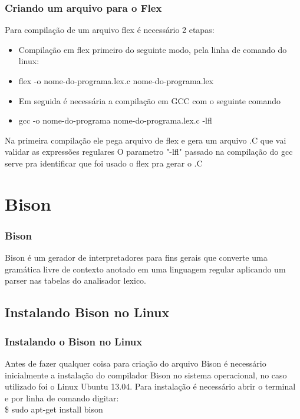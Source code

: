 \documentclass{beamer}
\begin{document}
\begin{frame}
\frametitle{Criando um arquivo para o Flex}
	Para compilação de um arquivo flex é necessário 2 etapas:
	  \begin{itemize} 				%
	    \item<1->   Compilação em flex primeiro do seguinte modo, pela linha de comando do linux:	%
	    \item<2-> flex -o nome-do-programa.lex.c nome-do-programa.lex
	    \item<3-> Em seguida é necessária a compilação em GCC com o seguinte comando\:
	    \item<4-> gcc -o nome-do-programa nome-do-programa.lex.c -lfl
    \end{itemize}

	Na primeira compilação ele pega arquivo de flex e gera um arquivo .C que vai validar as expressões regulares 
O parametro "-lfl" passado na compilação do gcc serve pra identificar que foi usado o flex pra gerar o .C

	
\end{frame}

\section{Bison}
\begin{frame}
\frametitle{Bison}
Bison é um gerador de interpretadores para fins gerais que converte uma gramática livre de contexto anotado em uma 
linguagem regular aplicando um parser nas tabelas do analisador lexico.

\end{frame}
\subsection{Instalando Bison no Linux}
\begin{frame}
\frametitle{Instalando o Bison no Linux}

Antes de fazer qualquer coisa para criação do arquivo Bison é necessário inicialmente a instalação do 
compilador Bison no sistema operacional, no caso utilizado foi o Linux Ubuntu 13.04.
	Para instalação é necessário abrir o terminal e por linha de comando digitar: 
			\\ \$ sudo apt-get install bison

\end{frame}
\end{document}
